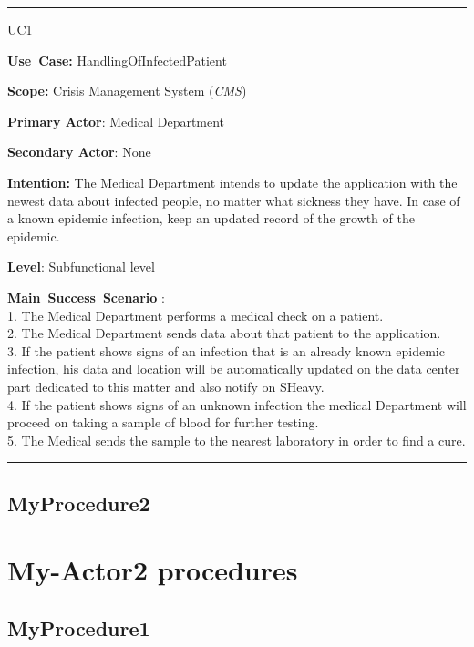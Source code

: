 \vspace{0.5cm}
\hrule
\vspace{0.5cm}
\begin{lyxlist}{UC1}
\small{
\item [\textbf{Use~Case:}] HandlingOfInfectedPatient
\item [\textbf{Scope:}] Crisis Management System (\emph{CMS})
\item [\textbf{Primary Actor}:] Medical Department
\item [\textbf{Secondary Actor}:] None
\item [\textbf{Intention:}]The Medical Department intends to update
the application with the newest data about infected people, no matter what
sickness they have. In case of a known epidemic infection, keep an updated
record of the growth of the epidemic.
\item [\textbf{Level}:]Subfunctional level
\item [\textbf{Main~Success~Scenario}]:\\
1. The Medical Department performs a medical check on a patient.\\
2. The Medical Department sends data about that patient to the application.\\
3. If the patient shows signs of an infection that is an already known epidemic infection, his data
and location will be automatically updated on the data center part dedicated to
this matter and also notify on SHeavy.\\
4. If the patient shows signs of an unknown infection the medical Department
will proceed on taking a sample of blood for further testing.\\
5. The Medical sends the sample to the nearest laboratory in order to find a
cure.\\
}
\end{lyxlist}
\hrule
\vspace{0.5cm} 

\subsection{MyProcedure2}




\section{My-Actor2 procedures}
\subsection{MyProcedure1}

